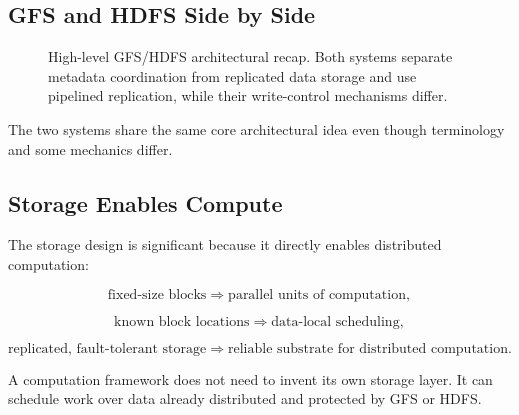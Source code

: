 \documentclass[11pt,a4paper,oneside]{book}
\begin{document}
\subsection{GFS and HDFS Side by Side}

\begin{figure}[htbp]
\centering
{}
\caption{High-level GFS/HDFS architectural recap. Both systems separate metadata coordination from replicated data storage and use pipelined replication, while their write-control mechanisms differ.}
\label{fig:gfs-hdfs-recap}
\end{figure}

The two systems share the same core architectural idea even though terminology and some mechanics differ.

\subsection{Storage Enables Compute}

The storage design is significant because it directly enables distributed computation:

\[
\text{fixed-size blocks}
\Longrightarrow
\text{parallel units of computation},
\]

\[
\text{known block locations}
\Longrightarrow
\text{data-local scheduling},
\]

\[
\text{replicated, fault-tolerant storage}
\Longrightarrow
\text{reliable substrate for distributed computation}.
\]

A computation framework does not need to invent its own storage layer. It can schedule work over data already distributed and protected by GFS or HDFS.
\end{document}
